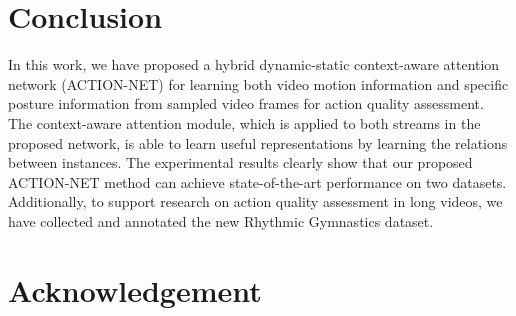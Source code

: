 \documentclass[sigconf]{acmart}
\begin{document}
\begin{table}[]
\vspace{0.2cm}
\caption{Ablation study showing the contribution of human detection in our method. 
}
\label{tab:ablation study 3}
\vspace{-1cm}
\end{table}

\vspace{-0.1cm}

\section{Conclusion}

In this work, we have proposed a hybrid dynamic-static context-aware attention network (ACTION-NET) for learning both video motion information and specific posture information from sampled video frames for action quality assessment. The context-aware attention module, which is applied to both streams in the proposed network, is able to learn useful representations by learning the relations between instances. 
The experimental results clearly show that our proposed ACTION-NET method can achieve state-of-the-art performance on two datasets.
Additionally, to support research on action quality assessment in long videos, we have collected and annotated the new Rhythmic Gymnastics dataset.

\vspace{-0.1cm}

\section{Acknowledgement}
\end{document}
